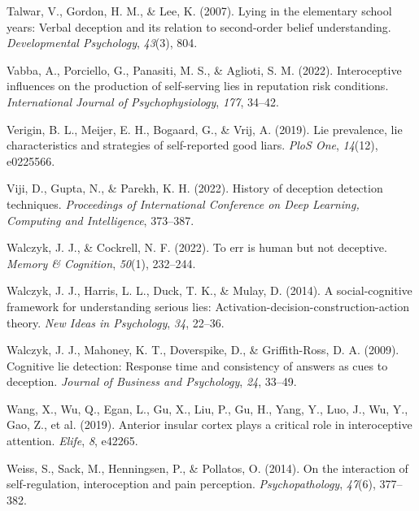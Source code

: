 \documentclass[
  man,mask,floatsintext]{apa6}
\newlength{\cslhangindent}
\newlength{\cslentryspacingunit} %
\newenvironment{CSLReferences}[2] %
 {%
  \setlength{\parindent}{0pt}
  \ifodd #1
  \let\oldpar\par
  \def\par{\hangindent=\cslhangindent\oldpar}
  \fi
  \setlength{\parskip}{#2\cslentryspacingunit}
 }%
 {}
\begin{document}
\begin{CSLReferences}{1}{0}
\leavevmode{}%
Talwar, V., Gordon, H. M., \& Lee, K. (2007). Lying in the elementary school years: Verbal deception and its relation to second-order belief understanding. \emph{Developmental Psychology}, \emph{43}(3), 804.

\leavevmode{}%
Vabba, A., Porciello, G., Panasiti, M. S., \& Aglioti, S. M. (2022). Interoceptive influences on the production of self-serving lies in reputation risk conditions. \emph{International Journal of Psychophysiology}, \emph{177}, 34--42.

\leavevmode{}%
Verigin, B. L., Meijer, E. H., Bogaard, G., \& Vrij, A. (2019). Lie prevalence, lie characteristics and strategies of self-reported good liars. \emph{PloS One}, \emph{14}(12), e0225566.

\leavevmode{}%
Viji, D., Gupta, N., \& Parekh, K. H. (2022). History of deception detection techniques. \emph{Proceedings of International Conference on Deep Learning, Computing and Intelligence}, 373--387.

\leavevmode{}%
Walczyk, J. J., \& Cockrell, N. F. (2022). To err is human but not deceptive. \emph{Memory \& Cognition}, \emph{50}(1), 232--244.

\leavevmode{}%
Walczyk, J. J., Harris, L. L., Duck, T. K., \& Mulay, D. (2014). A social-cognitive framework for understanding serious lies: Activation-decision-construction-action theory. \emph{New Ideas in Psychology}, \emph{34}, 22--36.

\leavevmode{}%
Walczyk, J. J., Mahoney, K. T., Doverspike, D., \& Griffith-Ross, D. A. (2009). Cognitive lie detection: Response time and consistency of answers as cues to deception. \emph{Journal of Business and Psychology}, \emph{24}, 33--49.

\leavevmode{}%
Wang, X., Wu, Q., Egan, L., Gu, X., Liu, P., Gu, H., Yang, Y., Luo, J., Wu, Y., Gao, Z., et al. (2019). Anterior insular cortex plays a critical role in interoceptive attention. \emph{Elife}, \emph{8}, e42265.

\leavevmode{}%
Weiss, S., Sack, M., Henningsen, P., \& Pollatos, O. (2014). On the interaction of self-regulation, interoception and pain perception. \emph{Psychopathology}, \emph{47}(6), 377--382.


\end{CSLReferences}
\end{document}
